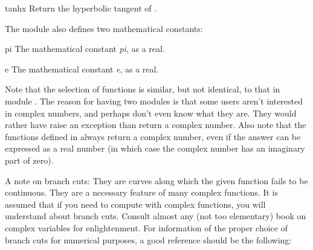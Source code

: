 \begin{funcdesc}{tanh}{x}
Return the hyperbolic tangent of .
\end{funcdesc}

The module also defines two mathematical constants:

\begin{datadesc}{pi}
The mathematical constant \emph{pi}, as a real.
\end{datadesc}

\begin{datadesc}{e}
The mathematical constant \emph{e}, as a real.
\end{datadesc}

Note that the selection of functions is similar, but not identical, to
that in module .  The reason for having
two modules is that some users aren't interested in complex numbers,
and perhaps don't even know what they are.  They would rather have
 raise an exception than return a complex number.
Also note that the functions defined in  always return a
complex number, even if the answer can be expressed as a real number
(in which case the complex number has an imaginary part of zero).

A note on branch cuts: They are curves along which the given function
fails to be continuous.  They are a necessary feature of many complex
functions.  It is assumed that if you need to compute with complex
functions, you will understand about branch cuts.  Consult almost any
(not too elementary) book on complex variables for enlightenment.  For
information of the proper choice of branch cuts for numerical
purposes, a good reference should be the following:

\begin{seealso}
\end{seealso}
